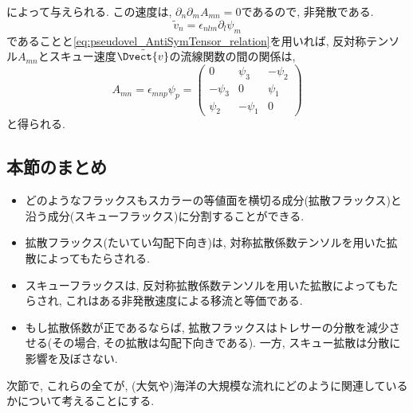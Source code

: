 によって与えられる. 
この速度は, $\partial_n \partial_m A_{mn}=0$であるので, 非発散である. 
\begin{equation}
  \tilde{v}_n = \epsilon_{nlm} \partial_l \psi_m
\end{equation}
であることと\eqref{eq:pseudovel_AntiSymTensor_relation}を用いれば, 
反対称テンソル$A_{mn}$とスキュー速度$\tilde{\Dvect{v}}$の流線関数の間の関係は, 
\begin{equation}
  A_{mn} = \epsilon_{mnp} \psi_p =
\begin{pmatrix}
 0 &\psi_3 &-\psi_2 \\
 -\psi_3 &0 &\psi_1 \\
 \psi_2  &-\psi_1 &0
\end{pmatrix}
\label{eq:AntiSymTensor_Psi_relation}
\end{equation}
と得られる. 

\subsection{本節のまとめ}
\begin{itemize}
 \item どのようなフラックスもスカラーの等値面を横切る成分(拡散フラックス)と沿う成分(スキューフラックス)に分割することができる.
 \item 拡散フラックス(たいてい勾配下向き)は, 対称拡散係数テンソルを用いた拡散によってもたらされる.
 \item スキューフラックスは, 反対称拡散係数テンソルを用いた拡散によってもたらされ, これはある非発散速度による移流と等価である.
 \item もし拡散係数が正であるならば, 拡散フラックスはトレサーの分散を減少させる(その場合, その拡散は勾配下向きである). 一方, スキュー拡散は分散に影響を及ぼさない.   
\end{itemize}
次節で, これらの全てが, (大気や)海洋の大規模な流れにどのように関連しているかについて考えることにする. 